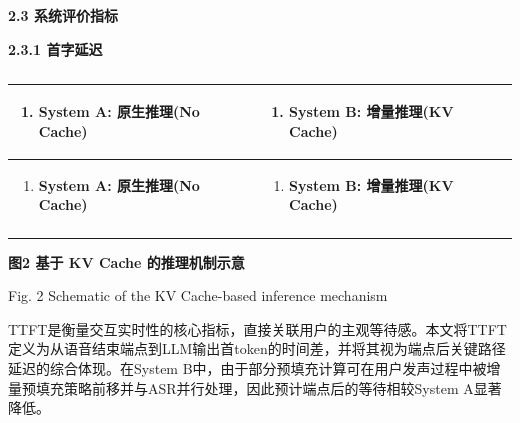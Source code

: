 \documentclass[
]{article}
\begin{document}
\textbf{2.3 系统评价指标}

\textbf{2.3.1 首字延迟}

\begin{longtable}[]{@{}
  >{\raggedright\arraybackslash}p{}
  >{\raggedright\arraybackslash}p{}@{}}
\caption{}\tabularnewline
\toprule\noalign{}
\begin{minipage}[b]{\linewidth}\raggedright
\begin{enumerate}
\def\labelenumi{(\alph{enumi})}
\item
  \textbf{System A: 原生推理(No Cache)}
\end{enumerate}
\end{minipage} & \begin{minipage}[b]{\linewidth}\raggedright
\begin{enumerate}
\def\labelenumi{(\alph{enumi})}
\setcounter{enumi}{1}
\item
  \textbf{System B: 增量推理(KV Cache)}
\end{enumerate}
\end{minipage} \\
\midrule\noalign{}
\endfirsthead
\toprule\noalign{}
\begin{minipage}[b]{\linewidth}\raggedright
\begin{enumerate}
\def\labelenumi{(\alph{enumi})}
\item
  \textbf{System A: 原生推理(No Cache)}
\end{enumerate}
\end{minipage} & \begin{minipage}[b]{\linewidth}\raggedright
\begin{enumerate}
\def\labelenumi{(\alph{enumi})}
\setcounter{enumi}{1}
\item
  \textbf{System B: 增量推理(KV Cache)}
\end{enumerate}
\end{minipage} \\
\midrule\noalign{}
\endhead
\bottomrule\noalign{}
\endlastfoot
\end{longtable}

\textbf{图2 基于 KV Cache 的推理机制示意}

Fig. 2 Schematic of the KV Cache-based inference mechanism

TTFT是衡量交互实时性的核心指标，直接关联用户的主观等待感。本文将TTFT定义为从语音结束端点到LLM输出首token的时间差，并将其视为端点后关键路径延迟的综合体现。在System B中，由于部分预填充计算可在用户发声过程中被增量预填充策略前移并与ASR并行处理，因此预计端点后的等待相较System A显著降低。
\end{document}
